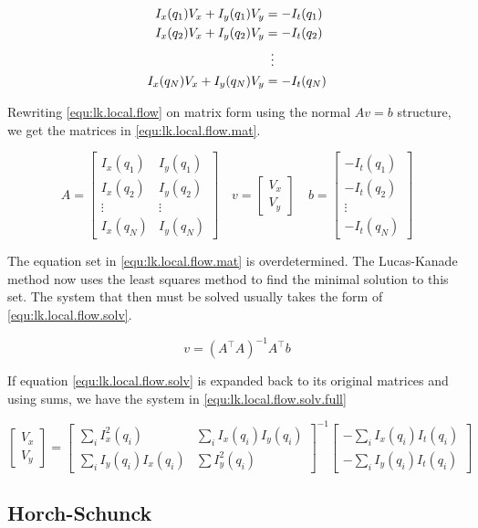 \begin{align}\label{equ:lk.local.flow}
I_x(q_1)V_x + I_y(q_1)V_y	&= -I_t(q_1) \\
I_x(q_2)V_x + I_y(q_2)V_y 	&= -I_t(q_2) \notag \\
&\,\,\, \vdots \notag \\
I_x(q_N)V_x + I_y(q_N)V_y 	&= -I_t(q_N) \notag
\end{align}

Rewriting \eqref{equ:lk.local.flow} on matrix form using the normal $Av = b$ structure, we get the matrices in \eqref{equ:lk.local.flow.mat}.

\begin{equation} \label{equ:lk.local.flow.mat}
A = 
\begin{bmatrix}
	I_x(q_1) 	& I_y(q_1) \\
	I_x(q_2) 	& I_y(q_2) \\ 
	\vdots 		& \vdots \\
	I_x(q_N)	& I_y(q_N)
\end{bmatrix} \quad 
v = 
\begin{bmatrix}
V_x \\ V_y
\end{bmatrix} \quad
b = 
\begin{bmatrix}
-I_t(q_1) \\ -I_t(q_2) \\ \vdots \\ -I_t(q_N)
\end{bmatrix}
\end{equation}

The equation set in \eqref{equ:lk.local.flow.mat} is overdetermined. The Lucas-Kanade method now uses the 
least squares method to find the minimal solution to this set. The system that then must be solved usually takes the 
form of \eqref{equ:lk.local.flow.solv}.

\begin{equation}\label{equ:lk.local.flow.solv}
v = \left(A^\top A\right)^{-1} A^\top b
\end{equation}

If equation \eqref{equ:lk.local.flow.solv} is expanded back to its original matrices and using sums, we have the system in \eqref{equ:lk.local.flow.solv.full}

\begin{equation}\label{equ:lk.local.flow.solv.full}
\begin{bmatrix}
V_x \\ V_y
\end{bmatrix} = 
\begin{bmatrix}
\sum_ i{I_x^2(q_i)} 	 & \sum_i{I_x(q_i)I_y(q_i)} \\
\sum_i{I_y(q_i)I_x(q_i)} & \sum{I_y^2(q_i)}
\end{bmatrix}^{-1}
\begin{bmatrix}
-\sum_i{I_x(q_i)I_t(q_i)} \\ -\sum_i{I_y(q_i)I_t(q_i)}
\end{bmatrix}
\end{equation}

\subsection{Horch-Schunck}
